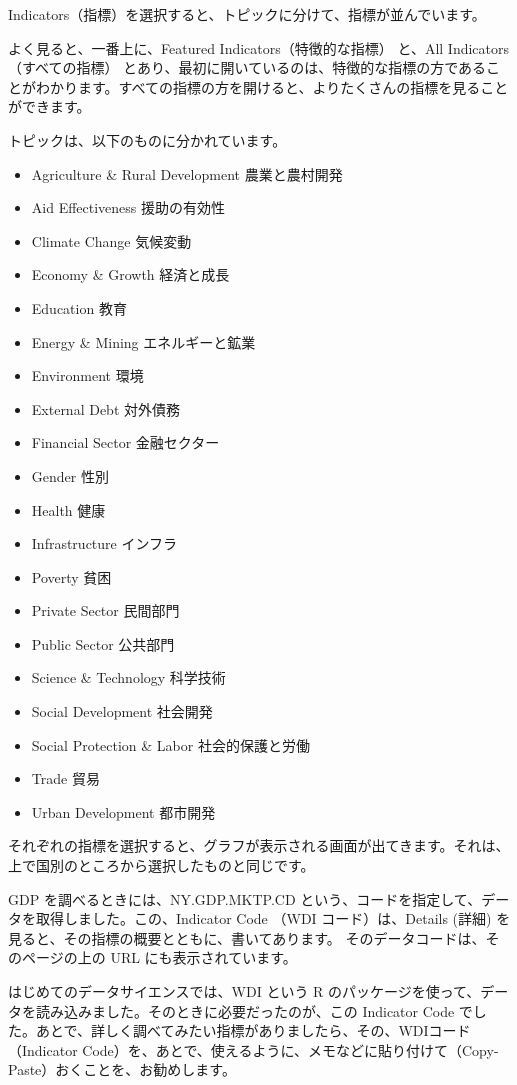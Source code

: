 \documentclass[
  xelatex, ja=standard]{bxjsbook}
\providecommand{\tightlist}{%
  \setlength{\itemsep}{0pt}\setlength{\parskip}{0pt}}
\theoremstyle{definition}
\theoremstyle{definition}
\theoremstyle{definition}
\theoremstyle{definition}
\theoremstyle{remark}
\begin{document}
Indicators（指標）を選択すると、トピックに分けて、指標が並んでいます。

よく見ると、一番上に、Featured Indicators（特徴的な指標） と、All Indicators（すべての指標） とあり、最初に開いているのは、特徴的な指標の方であることがわかります。すべての指標の方を開けると、よりたくさんの指標を見ることができます。

トピックは、以下のものに分かれています。

\begin{itemize}
\tightlist
\item
  Agriculture \& Rural Development 農業と農村開発
\item
  Aid Effectiveness 援助の有効性
\item
  Climate Change 気候変動
\item
  Economy \& Growth 経済と成長
\item
  Education 教育
\item
  Energy \& Mining エネルギーと鉱業
\item
  Environment 環境
\item
  External Debt 対外債務
\item
  Financial Sector 金融セクター
\item
  Gender 性別
\item
  Health 健康
\item
  Infrastructure インフラ
\item
  Poverty 貧困
\item
  Private Sector 民間部門
\item
  Public Sector 公共部門
\item
  Science \& Technology 科学技術
\item
  Social Development 社会開発
\item
  Social Protection \& Labor 社会的保護と労働
\item
  Trade 貿易
\item
  Urban Development 都市開発
\end{itemize}

それぞれの指標を選択すると、グラフが表示される画面が出てきます。それは、上で国別のところから選択したものと同じです。

GDP を調べるときには、NY.GDP.MKTP.CD という、コードを指定して、データを取得しました。この、Indicator Code （WDI コード）は、Details (詳細) を見ると、その指標の概要とともに、書いてあります。 そのデータコードは、そのページの上の URL にも表示されています。

はじめてのデータサイエンスでは、WDI という R のパッケージを使って、データを読み込みました。そのときに必要だったのが、この Indicator Code でした。あとで、詳しく調べてみたい指標がありましたら、その、WDIコード（Indicator Code）を、あとで、使えるように、メモなどに貼り付けて（Copy-Paste）おくことを、お勧めします。
\end{document}
